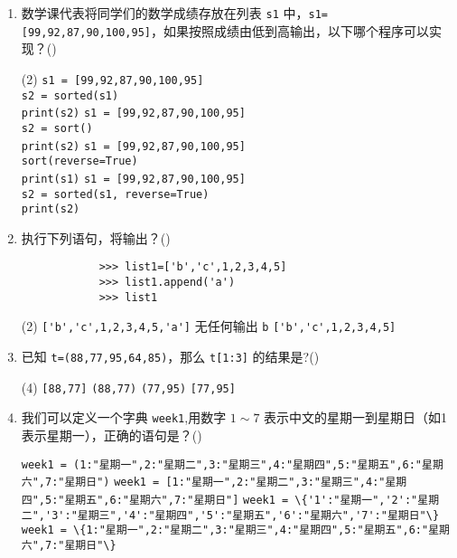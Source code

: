 \documentclass[11pt]{ctexart}
\begin{document}
\begin{enumerate}
        \item 数学课代表将同学们的数学成绩存放在列表 \lstinline{s1} 中，\lstinline!s1=[99,92,87,90,100,95]!，如果按照成绩由低到高输出，以下哪个程序可以实现？(\qquad)
        \begin{tasks}(2)
            \task \lstinline!s1 = [99,92,87,90,100,95]!\\\lstinline!s2 = sorted(s1)!\\\lstinline!print(s2)!
            \task \lstinline!s1 = [99,92,87,90,100,95]!\\\lstinline!s2 = sort()!\\\lstinline!print(s2)!
            \task \lstinline!s1 = [99,92,87,90,100,95]!\\\lstinline!sort(reverse=True)!\\\lstinline!print(s1)!
            \task \lstinline!s1 = [99,92,87,90,100,95]!\\\lstinline!s2 = sorted(s1, reverse=True)!\\\lstinline!print(s2)!
        \end{tasks}

        \item  执行下列语句，将输出？(\qquad)
        \begin{lstlisting}
            >>> list1=['b','c',1,2,3,4,5] 
            >>> list1.append('a') 
            >>> list1
        \end{lstlisting}
        \begin{tasks}(2)
            \task \lstinline!['b','c',1,2,3,4,5,'a']!
            \task 无任何输出
            \task \lstinline{b}
            \task \lstinline!['b','c',1,2,3,4,5]!
        \end{tasks}

        \newpage
        \item 已知 \lstinline!t=(88,77,95,64,85)!，那么 \lstinline!t[1:3]! 的结果是?(\qquad)
        \begin{tasks}(4)
            \task \lstinline![88,77]!
            \task \lstinline!(88,77)!
            \task \lstinline!(77,95)!
            \task \lstinline![77,95]!
        \end{tasks}

        \item 我们可以定义一个字典 \lstinline{week1},用数字 $1\sim 7$ 表示中文的星期一到星期日（如1表示星期一），正确的语句是？(\qquad)
        \begin{tasks}
            \task \footnotesize \lstinline!week1 = (1:"星期一",2:"星期二",3:"星期三",4:"星期四",5:"星期五",6:"星期六",7:"星期日")!
            \task \footnotesize \lstinline!week1 = [1:"星期一",2:"星期二",3:"星期三",4:"星期四",5:"星期五",6:"星期六",7:"星期日"]!
            \task \footnotesize \lstinline!week1 = \{'1':"星期一",'2':"星期二",'3':"星期三",'4':"星期四",'5':"星期五",'6':"星期六",'7':"星期日"\}!
            \task \footnotesize \lstinline!week1 = \{1:"星期一",2:"星期二",3:"星期三",4:"星期四",5:"星期五",6:"星期六",7:"星期日"\}!
        \end{tasks}


\end{enumerate}
\end{document}
